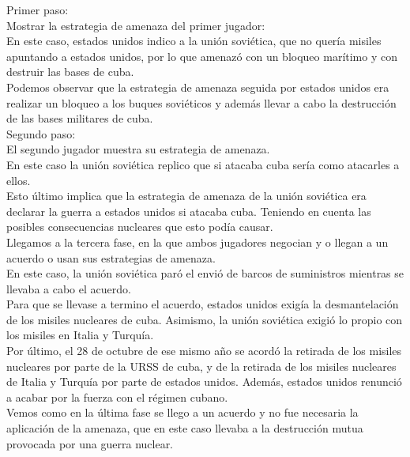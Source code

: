 \documentclass[10pt,a4paper]{book}
\begin{document}
Primer paso: \\
Mostrar la estrategia de amenaza del primer jugador:\\
En este caso, estados unidos indico a la unión soviética, que no quería misiles apuntando a estados unidos, por lo que amenazó con un bloqueo marítimo y con destruir las bases de cuba.\\

Podemos observar que la estrategia de amenaza seguida por estados unidos era realizar un bloqueo a los buques soviéticos y además llevar a cabo la destrucción de las bases militares de cuba.\\

Segundo paso:\\
El segundo jugador muestra su estrategia de amenaza.\\

En este caso la unión soviética replico que si atacaba cuba sería como atacarles a ellos.\\

Esto último implica que la estrategia de amenaza de la unión soviética era declarar la guerra a estados unidos si atacaba cuba. Teniendo en cuenta las posibles consecuencias nucleares que esto podía causar.\\

Llegamos a la tercera fase, en la que ambos jugadores negocian y o llegan a un acuerdo o usan sus estrategias de amenaza.\\

En este caso, la unión soviética paró el envió de barcos de suministros mientras se llevaba a cabo el acuerdo. \\

Para que se llevase a termino el acuerdo, estados unidos exigía la desmantelación de los misiles nucleares de cuba. Asimismo, la unión soviética exigió lo propio con los misiles en Italia y Turquía. \\

Por último, el 28 de octubre de ese mismo año se acordó la retirada de los misiles nucleares por parte de la URSS de cuba, y de la retirada de los misiles nucleares de Italia y Turquía por parte de estados unidos. Además, estados unidos renunció a acabar por la fuerza con el régimen cubano.\\


Vemos como en la última fase se llego a un acuerdo y no fue necesaria la aplicación de la amenaza, que en este caso llevaba a la destrucción mutua provocada por una guerra nuclear.\\
\end{document}

